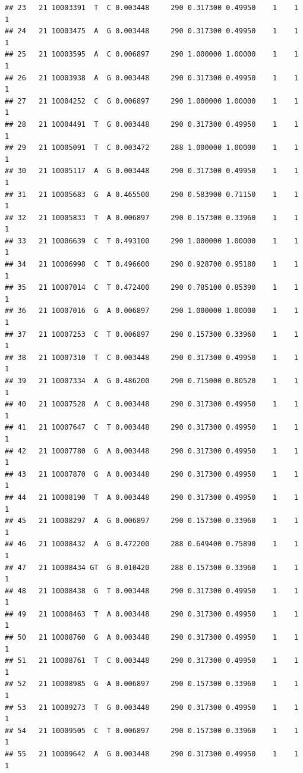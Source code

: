 \documentclass[
]{article}
\begin{document}
\begin{verbatim}
## 23   21 10003391  T  C 0.003448     290 0.317300 0.49950    1    1        1
## 24   21 10003475  A  G 0.003448     290 0.317300 0.49950    1    1        1
## 25   21 10003595  A  C 0.006897     290 1.000000 1.00000    1    1        1
## 26   21 10003938  A  G 0.003448     290 0.317300 0.49950    1    1        1
## 27   21 10004252  C  G 0.006897     290 1.000000 1.00000    1    1        1
## 28   21 10004491  T  G 0.003448     290 0.317300 0.49950    1    1        1
## 29   21 10005091  T  C 0.003472     288 1.000000 1.00000    1    1        1
## 30   21 10005117  A  G 0.003448     290 0.317300 0.49950    1    1        1
## 31   21 10005683  G  A 0.465500     290 0.583900 0.71150    1    1        1
## 32   21 10005833  T  A 0.006897     290 0.157300 0.33960    1    1        1
## 33   21 10006639  C  T 0.493100     290 1.000000 1.00000    1    1        1
## 34   21 10006998  C  T 0.496600     290 0.928700 0.95180    1    1        1
## 35   21 10007014  C  T 0.472400     290 0.785100 0.85390    1    1        1
## 36   21 10007016  G  A 0.006897     290 1.000000 1.00000    1    1        1
## 37   21 10007253  C  T 0.006897     290 0.157300 0.33960    1    1        1
## 38   21 10007310  T  C 0.003448     290 0.317300 0.49950    1    1        1
## 39   21 10007334  A  G 0.486200     290 0.715000 0.80520    1    1        1
## 40   21 10007528  A  C 0.003448     290 0.317300 0.49950    1    1        1
## 41   21 10007647  C  T 0.003448     290 0.317300 0.49950    1    1        1
## 42   21 10007780  G  A 0.003448     290 0.317300 0.49950    1    1        1
## 43   21 10007870  G  A 0.003448     290 0.317300 0.49950    1    1        1
## 44   21 10008190  T  A 0.003448     290 0.317300 0.49950    1    1        1
## 45   21 10008297  A  G 0.006897     290 0.157300 0.33960    1    1        1
## 46   21 10008432  A  G 0.472200     288 0.649400 0.75890    1    1        1
## 47   21 10008434 GT  G 0.010420     288 0.157300 0.33960    1    1        1
## 48   21 10008438  G  T 0.003448     290 0.317300 0.49950    1    1        1
## 49   21 10008463  T  A 0.003448     290 0.317300 0.49950    1    1        1
## 50   21 10008760  G  A 0.003448     290 0.317300 0.49950    1    1        1
## 51   21 10008761  T  C 0.003448     290 0.317300 0.49950    1    1        1
## 52   21 10008985  G  A 0.006897     290 0.157300 0.33960    1    1        1
## 53   21 10009273  T  G 0.003448     290 0.317300 0.49950    1    1        1
## 54   21 10009505  C  T 0.006897     290 0.157300 0.33960    1    1        1
## 55   21 10009642  A  G 0.003448     290 0.317300 0.49950    1    1        1

\end{verbatim}
\end{document}
